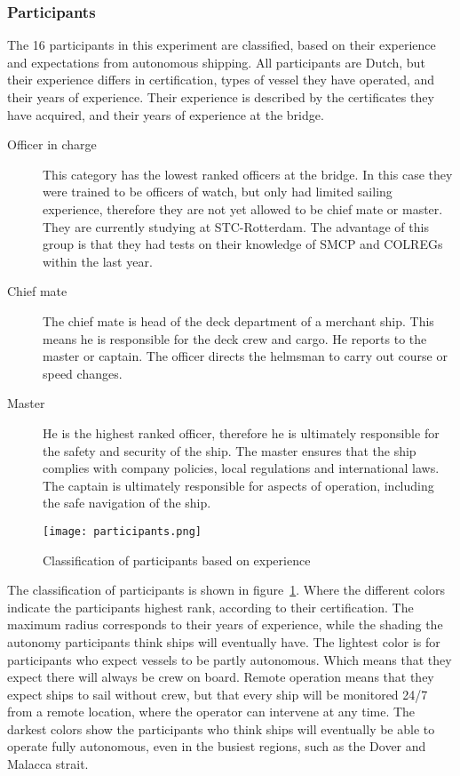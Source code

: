 \subsubsection{Participants}
The 16 participants in this experiment are classified, based on their experience and expectations from autonomous shipping. All participants are Dutch, but their experience differs in certification, types of vessel they have operated, and their years of experience. Their experience is described by the certificates they have acquired, and their years of experience at the bridge. 
\begin{description}
	\item[Officer in charge] This category has the lowest ranked officers at the bridge. In this case they were trained to be officers of watch, but only had limited sailing experience, therefore they are not yet allowed to be chief mate or master. They are currently studying at STC-Rotterdam. The advantage of this group is that they had tests on their knowledge of SMCP and COLREGs within the last year.
	\item[Chief mate] The chief mate is head of the deck department of a merchant ship. This means he is responsible for the deck crew and cargo. He reports to the master or captain. The officer directs the helmsman to carry out course or speed changes.
	\item[Master] He is the highest ranked officer, therefore he is ultimately responsible for the safety and security of the ship. The master ensures that the ship complies with company policies, local regulations and international laws. The captain is ultimately responsible for aspects of operation, including the safe navigation of the ship.
\end{description}

\begin{figure}[h]
	\centering
	\texttt{[image: participants.png]}
	\caption{Classification of participants based on experience}
	\label{fig:participants}
\end{figure}

The classification of participants is shown in figure~\ref{fig:participants}. Where the different colors indicate the participants highest rank, according to their certification. The maximum radius corresponds to their years of experience, while the shading the autonomy participants think ships will eventually have. 
The lightest color is for participants who expect vessels to be partly autonomous. Which means that they expect there will always be crew on board. Remote operation means that they expect ships to sail without crew, but that every ship will be monitored 24/7 from a remote location, where the operator can intervene at any time. The darkest colors show the participants who think ships will eventually be able to operate fully autonomous, even in the busiest regions, such as the Dover and Malacca strait.

